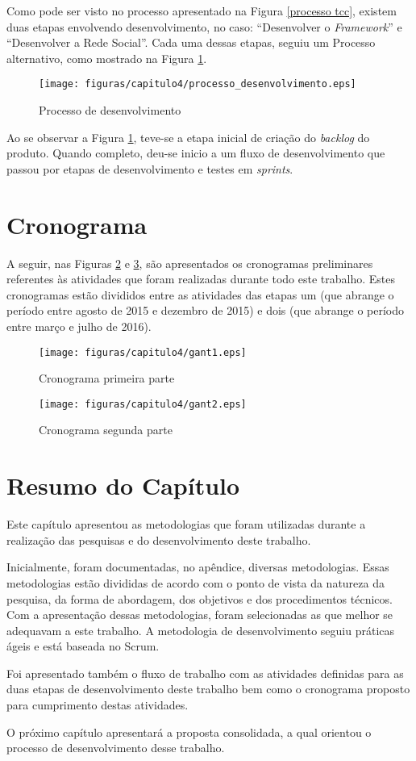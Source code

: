 Como pode ser visto no processo apresentado na Figura \ref{processo tcc}, existem duas etapas  envolvendo desenvolvimento, no caso: ``Desenvolver o \textit{Framework}'' e ``Desenvolver a Rede Social''. Cada uma dessas etapas, seguiu um Processo alternativo, como mostrado na Figura \ref{Processo desenvolvimento}.

\begin{figure}[h]
	\centering
	\texttt{[image: figuras/capitulo4/processo\_desenvolvimento.eps]}
	\caption{Processo de desenvolvimento}
	\label{Processo desenvolvimento}
\end{figure}

Ao se observar a Figura \ref{Processo desenvolvimento}, teve-se a etapa inicial de criação do \textit{backlog} do produto. Quando completo, deu-se inicio a um fluxo de desenvolvimento que passou por etapas de desenvolvimento e testes em \textit{sprints}.

\section{Cronograma}

A seguir, nas Figuras \ref{cronograma_parte_1} e \ref{cronograma_parte_2}, são apresentados os cronogramas preliminares referentes às atividades que foram realizadas durante todo este trabalho. Estes cronogramas estão divididos entre as atividades das etapas um (que abrange o período entre agosto de 2015 e dezembro de 2015) e dois (que abrange o período entre março e julho de 2016).

\begin{figure}[h]
	\centering
	\texttt{[image: figuras/capitulo4/gant1.eps]}
	\caption{Cronograma primeira parte}
	\label{cronograma_parte_1}
\end{figure}

\begin{figure}[h]
	\centering
	\texttt{[image: figuras/capitulo4/gant2.eps]}
	\caption{Cronograma segunda parte}
	\label{cronograma_parte_2}
\end{figure}

\section{Resumo do Capítulo}

Este capítulo apresentou as metodologias que foram utilizadas durante a realização das pesquisas e do desenvolvimento deste trabalho.

Inicialmente, foram documentadas, no apêndice, diversas metodologias. Essas metodologias estão divididas de acordo com o ponto de vista da natureza da pesquisa, da forma de abordagem, dos objetivos e dos procedimentos técnicos. Com a apresentação dessas metodologias, foram selecionadas as que melhor se adequavam a este trabalho. A metodologia de desenvolvimento seguiu práticas ágeis e está baseada no Scrum.

Foi apresentado também o fluxo de trabalho com as atividades definidas para as duas etapas de desenvolvimento deste trabalho bem como o cronograma proposto para cumprimento destas atividades.

O próximo capítulo apresentará a proposta consolidada, a qual orientou o processo de desenvolvimento desse trabalho.
